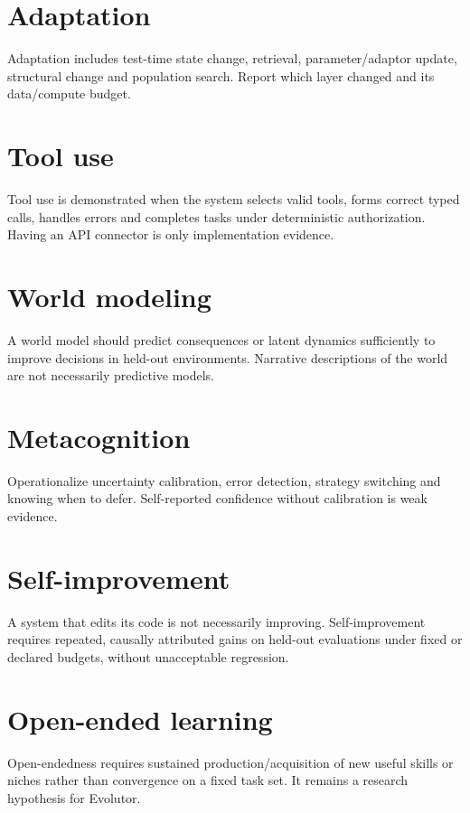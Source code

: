 \section{Adaptation}
Adaptation includes test-time state change, retrieval, parameter/adaptor update, structural change and population search. Report which layer changed and its data/compute budget.

\section{Tool use}
Tool use is demonstrated when the system selects valid tools, forms correct typed calls, handles errors and completes tasks under deterministic authorization. Having an API connector is only implementation evidence.

\section{World modeling}
A world model should predict consequences or latent dynamics sufficiently to improve decisions in held-out environments. Narrative descriptions of the world are not necessarily predictive models.

\section{Metacognition}
Operationalize uncertainty calibration, error detection, strategy switching and knowing when to defer. Self-reported confidence without calibration is weak evidence.

\section{Self-improvement}
A system that edits its code is not necessarily improving. Self-improvement requires repeated, causally attributed gains on held-out evaluations under fixed or declared budgets, without unacceptable regression.

\section{Open-ended learning}
Open-endedness requires sustained production/acquisition of new useful skills or niches rather than convergence on a fixed task set. It remains a research hypothesis for Evolutor.

